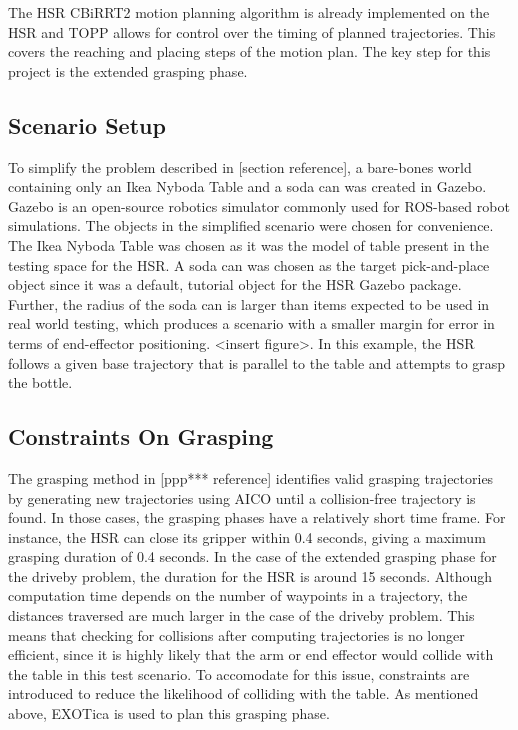 \documentclass[12pt]{article}
\begin{document}
            The HSR CBiRRT2 motion planning algorithm is already implemented on the HSR and TOPP allows for control over the timing of planned trajectories. This covers the reaching and placing steps of the motion plan. The key step for this project is the extended grasping phase.

        \subsection{Scenario Setup}
            To simplify the problem described in [section reference], a bare-bones world containing only an Ikea Nyboda Table and a soda can was created in Gazebo. Gazebo is an open-source robotics simulator commonly used for ROS-based robot simulations. The objects in the simplified scenario were chosen for convenience. The Ikea Nyboda Table was chosen as it was the model of table present in the testing space for the HSR. A soda can was chosen as the target pick-and-place object since it was a default, tutorial object for the HSR Gazebo package. Further, the radius of the soda can is larger than items expected to be used in real world testing, which produces a scenario with a smaller margin for error in terms of end-effector positioning. <insert figure>. In this example, the HSR follows a given base trajectory that is parallel to the table and attempts to grasp the bottle.
            
        \subsection{Constraints On Grasping}
            The grasping method in [ppp*** reference] identifies valid grasping trajectories by generating new trajectories using AICO until a collision-free trajectory is found. In those cases, the grasping phases have a relatively short time frame. For instance, the HSR can close its gripper within 0.4 seconds, giving a maximum grasping duration of 0.4 seconds. In the case of the extended grasping phase for the driveby problem, the duration for the HSR is around 15 seconds. Although computation time depends on the number of waypoints in a trajectory, the distances traversed are much larger in the case of the driveby problem. This means that checking for collisions after computing trajectories is no longer efficient, since it is highly likely that the arm or end effector would collide with the table in this test scenario. To accomodate for this issue, constraints are introduced to reduce the likelihood of colliding with the table. As mentioned above, EXOTica is used to plan this grasping phase.
\end{document}
